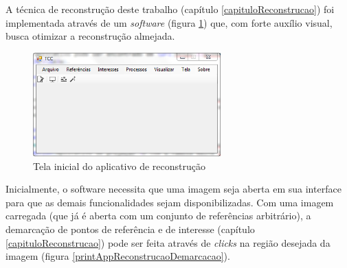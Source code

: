 		A técnica de reconstrução deste trabalho (capítulo \ref{capituloReconstrucao}) foi implementada através de um \textit{software} (figura \ref{printAppReconstrucao}) que, com forte auxílio visual, busca otimizar a reconstrução almejada.
		
		\begin{figure}[!htb]
			\centering
			\includegraphics[height=4cm]{imagens/printAppReconstrucao.png}
			\caption{Tela inicial do aplicativo de reconstrução}
			\label{printAppReconstrucao}
		\end{figure}
		
		Inicialmente, o software necessita que uma imagem seja aberta em sua interface para que as demais funcionalidades sejam disponibilizadas. Com uma imagem carregada (que já é aberta com um conjunto de referências arbitrário), a demarcação de pontos de referência e de interesse (capítulo \ref{capituloReconstrucao}) pode ser feita através de \textit{clicks} na região desejada da imagem (figura \ref{printAppReconstrucaoDemarcacao}).
		
